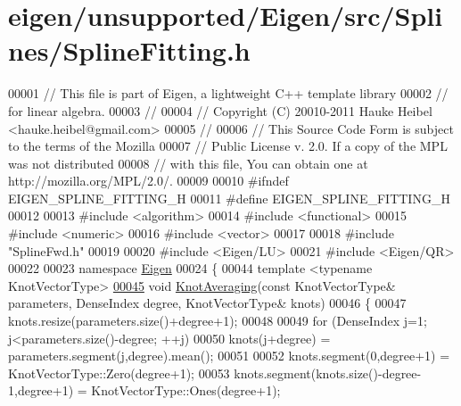 \hypertarget{eigen_2unsupported_2_eigen_2src_2_splines_2_spline_fitting_8h_source}{}\section{eigen/unsupported/\+Eigen/src/\+Splines/\+Spline\+Fitting.h}
\label{eigen_2unsupported_2_eigen_2src_2_splines_2_spline_fitting_8h_source}

\begin{DoxyCode}
00001 \textcolor{comment}{// This file is part of Eigen, a lightweight C++ template library}
00002 \textcolor{comment}{// for linear algebra.}
00003 \textcolor{comment}{//}
00004 \textcolor{comment}{// Copyright (C) 20010-2011 Hauke Heibel <hauke.heibel@gmail.com>}
00005 \textcolor{comment}{//}
00006 \textcolor{comment}{// This Source Code Form is subject to the terms of the Mozilla}
00007 \textcolor{comment}{// Public License v. 2.0. If a copy of the MPL was not distributed}
00008 \textcolor{comment}{// with this file, You can obtain one at http://mozilla.org/MPL/2.0/.}
00009 
00010 \textcolor{preprocessor}{#ifndef EIGEN\_SPLINE\_FITTING\_H}
00011 \textcolor{preprocessor}{#define EIGEN\_SPLINE\_FITTING\_H}
00012 
00013 \textcolor{preprocessor}{#include <algorithm>}
00014 \textcolor{preprocessor}{#include <functional>}
00015 \textcolor{preprocessor}{#include <numeric>}
00016 \textcolor{preprocessor}{#include <vector>}
00017 
00018 \textcolor{preprocessor}{#include "SplineFwd.h"}
00019 
00020 \textcolor{preprocessor}{#include <Eigen/LU>}
00021 \textcolor{preprocessor}{#include <Eigen/QR>}
00022 
00023 \textcolor{keyword}{namespace }\hyperlink{namespace_eigen}{Eigen}
00024 \{
00044   \textcolor{keyword}{template} <\textcolor{keyword}{typename} KnotVectorType>
\hyperlink{group___splines___module_ga9474da5ed68bbd9a6788a999330416d6}{00045}   \textcolor{keywordtype}{void} \hyperlink{group___splines___module_ga9474da5ed68bbd9a6788a999330416d6}{KnotAveraging}(\textcolor{keyword}{const} KnotVectorType& parameters, DenseIndex degree, KnotVectorType& 
      knots)
00046   \{
00047     knots.resize(parameters.size()+degree+1);      
00048 
00049     \textcolor{keywordflow}{for} (DenseIndex j=1; j<parameters.size()-degree; ++j)
00050       knots(j+degree) = parameters.segment(j,degree).mean();
00051 
00052     knots.segment(0,degree+1) = KnotVectorType::Zero(degree+1);
00053     knots.segment(knots.size()-degree-1,degree+1) = KnotVectorType::Ones(degree+1);

\end{DoxyCode}
